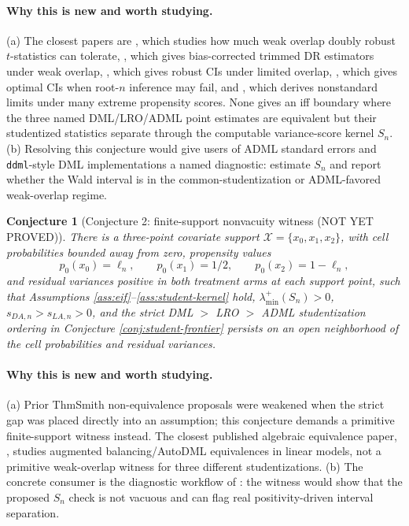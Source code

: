 \documentclass[11pt]{article}
\theoremstyle{definition}
\theoremstyle{plain}
\newtheorem{conjecture}{Conjecture}
\theoremstyle{remark}
\begin{document}
\paragraph{Why this is new and worth studying.}
(a) The closest papers are \citet{Dorn2025WeakOverlapTStats}, which studies
how much weak overlap doubly robust \(t\)-statistics can tolerate,
\citet{MaSantAnnaSasakiUra2026WeakOverlapDR}, which gives bias-corrected
trimmed DR estimators under weak overlap, \citet{Rothe2017LimitedOverlapCI},
which gives robust CIs under limited overlap,
\citet{ArmstrongKolesar2021ATE}, which gives optimal CIs when root-\(n\)
inference may fail, and \citet{HeilerKazak2021ExtremePS}, which derives
nonstandard limits under many extreme propensity scores.  None gives an iff
boundary where the three named DML/LRO/ADML point estimates are equivalent but
their studentized statistics separate through the computable variance-score
kernel \(S_n\).
(b) Resolving this conjecture would give users of ADML standard errors and
\texttt{ddml}-style DML implementations a named diagnostic: estimate \(S_n\)
and report whether the Wald interval is in the common-studentization or
ADML-favored weak-overlap regime.

\begin{conjecture}[Conjecture 2: finite-support nonvacuity witness (NOT YET PROVED)]\label{conj:witness}
There is a three-point covariate support
\(\mathcal X=\{x_0,x_1,x_2\}\), with cell probabilities bounded away from zero,
propensity values
\[
  p_0(x_0)=\ell_n,\qquad p_0(x_1)=1/2,\qquad p_0(x_2)=1-\ell_n,
\]
and residual variances positive in both treatment arms at each support point,
such that Assumptions \ref{ass:eif}--\ref{ass:student-kernel} hold,
\(\lambda_{\min}^+(S_n)>0\), \(s_{DA,n}>s_{LA,n}>0\), and the strict
DML \(>\) LRO \(>\) ADML studentization ordering in Conjecture
\ref{conj:student-frontier} persists on an open neighborhood of the cell
probabilities and residual variances.
\end{conjecture}
\paragraph{Why this is new and worth studying.}
(a) Prior ThmSmith non-equivalence proposals were weakened when the strict
gap was placed directly into an assumption; this conjecture demands a
primitive finite-support witness instead.  The closest published algebraic
equivalence paper, \citet{BrunsSmithDukesFellerOgburn2024ABW}, studies
augmented balancing/AutoDML equivalences in linear models, not a primitive
weak-overlap witness for three different studentizations.  (b) The concrete
consumer is the diagnostic workflow of \citet{PetersenPorterGruberWangVanDerLaan2012Positivity}:
the witness would show that the proposed \(S_n\) check is not vacuous and can
flag real positivity-driven interval separation.
\end{document}
